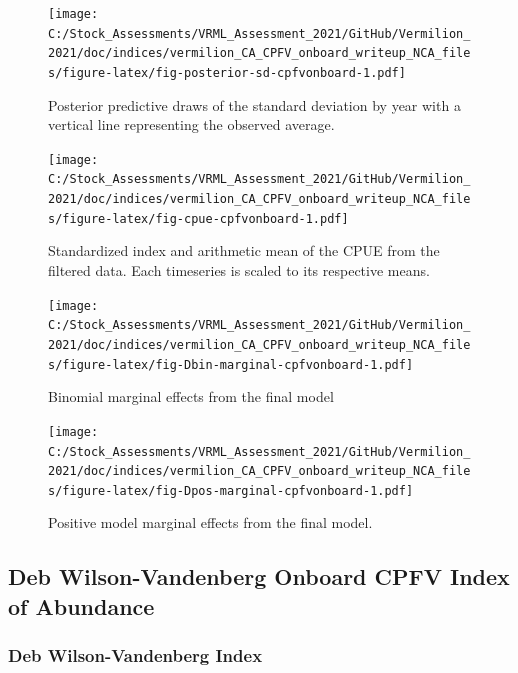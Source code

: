\documentclass[
  english,
  a4paper,
]{article}
\begin{document}
\begin{figure}
\centering
\texttt{[image: C:/Stock\_Assessments/VRML\_Assessment\_2021/GitHub/Vermilion\_2021/doc/indices/vermilion\_CA\_CPFV\_onboard\_writeup\_NCA\_files/figure-latex/fig-posterior-sd-cpfvonboard-1.pdf]}
\caption{\label{fig:fig-posterior-sd-cpfvonboard}Posterior predictive draws of the standard deviation by year with a vertical line representing the observed average.}
\end{figure}

\begin{figure}
\centering
\texttt{[image: C:/Stock\_Assessments/VRML\_Assessment\_2021/GitHub/Vermilion\_2021/doc/indices/vermilion\_CA\_CPFV\_onboard\_writeup\_NCA\_files/figure-latex/fig-cpue-cpfvonboard-1.pdf]}
\caption{\label{fig:fig-cpue-cpfvonboard}Standardized index and arithmetic mean of the CPUE from the filtered data. Each timeseries is scaled to its respective means.}
\end{figure}

\begin{figure}
\centering
\texttt{[image: C:/Stock\_Assessments/VRML\_Assessment\_2021/GitHub/Vermilion\_2021/doc/indices/vermilion\_CA\_CPFV\_onboard\_writeup\_NCA\_files/figure-latex/fig-Dbin-marginal-cpfvonboard-1.pdf]}
\caption{\label{fig:fig-Dbin-marginal-cpfvonboard}Binomial marginal effects from the final model}
\end{figure}

\begin{figure}
\centering
\texttt{[image: C:/Stock\_Assessments/VRML\_Assessment\_2021/GitHub/Vermilion\_2021/doc/indices/vermilion\_CA\_CPFV\_onboard\_writeup\_NCA\_files/figure-latex/fig-Dpos-marginal-cpfvonboard-1.pdf]}
\caption{\label{fig:fig-Dpos-marginal-cpfvonboard}Positive model marginal effects from the final model.}
\end{figure}

\clearpage

\hypertarget{deb-wilson-vandenberg-onboard-cpfv-index-of-abundance}{%
\subsection{Deb Wilson-Vandenberg Onboard CPFV Index of Abundance}\label{deb-wilson-vandenberg-onboard-cpfv-index-of-abundance}}

\hypertarget{deb-wilson-vandenberg-index}{%
\subsubsection{Deb Wilson-Vandenberg Index}\label{deb-wilson-vandenberg-index}}
\end{document}
